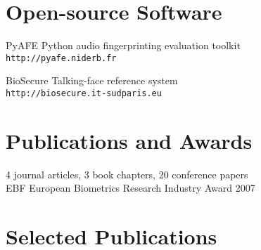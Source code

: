 \documentclass{simplecv}
\begin{document}
\section{Open-source Software}
\begin{topic}
\item[PyAFE] Python audio fingerprinting evaluation toolkit~\cite{Ramona2011}\\
\texttt{\small http://pyafe.niderb.fr}
\item[BioSecure] Talking-face reference system~\cite{Bredin2006a}\\
\texttt{\small http://biosecure.it-sudparis.eu}
\end{topic}

\section{Publications and Awards}

4 journal articles, 3 book chapters, 20 conference papers\\
EBF European Biometrics Research Industry Award 2007~\cite{Bredin2008}

\section{Selected Publications}
\nocite{Bredin2012,Bredin2012a,Ramona2011,Bredin2009,Bredin2008,Bredin2007,Argones-Rua2007a,Bredin2006a}



\end{document}
